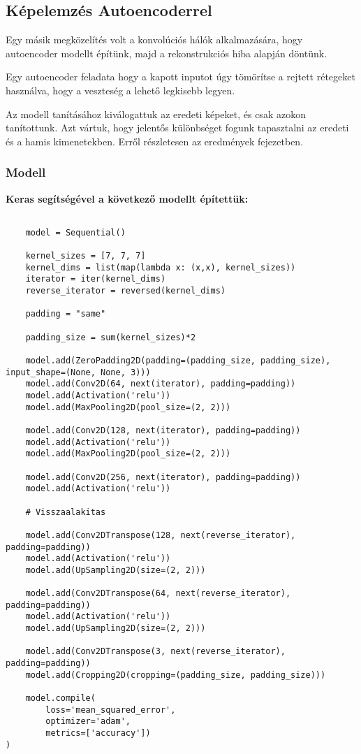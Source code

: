 \subsection{Képelemzés Autoencoderrel}
\label{sec:autoencoder}

Egy másik megközelítés volt a konvolúciós hálók alkalmazására, hogy autoencoder modellt 
építünk, majd a rekonstrukciós hiba alapján döntünk.

Egy autoencoder feladata hogy a kapott inputot úgy tömörítse a rejtett rétegeket
használva, hogy a veszteség a lehető legkisebb legyen.

Az modell tanításához kiválogattuk az eredeti képeket, és csak azokon tanítottunk.
Azt vártuk, hogy jelentős különbséget fogunk tapasztalni az eredeti és a hamis 
kimenetekben. Erről részletesen az eredmények fejezetben.


\subsubsection{Modell}
\noindent
\textbf{Keras segítségével a következő modellt építettük:}


\lstset{language=Python}
\begin{lstlisting}  

	model = Sequential()
	
	kernel_sizes = [7, 7, 7]
	kernel_dims = list(map(lambda x: (x,x), kernel_sizes))
	iterator = iter(kernel_dims)
	reverse_iterator = reversed(kernel_dims)
	
	padding = "same"
	
	padding_size = sum(kernel_sizes)*2
	
	model.add(ZeroPadding2D(padding=(padding_size, padding_size), input_shape=(None, None, 3)))
	model.add(Conv2D(64, next(iterator), padding=padding))
	model.add(Activation('relu'))
	model.add(MaxPooling2D(pool_size=(2, 2)))
	
	model.add(Conv2D(128, next(iterator), padding=padding))
	model.add(Activation('relu'))
	model.add(MaxPooling2D(pool_size=(2, 2)))
	
	model.add(Conv2D(256, next(iterator), padding=padding))
	model.add(Activation('relu'))
	
	# Visszaalakitas
	
	model.add(Conv2DTranspose(128, next(reverse_iterator), padding=padding))
	model.add(Activation('relu'))
	model.add(UpSampling2D(size=(2, 2)))
	
	model.add(Conv2DTranspose(64, next(reverse_iterator), padding=padding))
	model.add(Activation('relu'))
	model.add(UpSampling2D(size=(2, 2)))
	
	model.add(Conv2DTranspose(3, next(reverse_iterator), padding=padding))
	model.add(Cropping2D(cropping=(padding_size, padding_size)))
	
	model.compile(
		loss='mean_squared_error',
		optimizer='adam', 
		metrics=['accuracy']) 
) 

\end{lstlisting}


